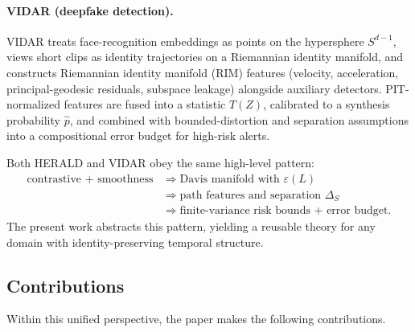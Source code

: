 \documentclass[11pt]{article}
\begin{document}
\paragraph{VIDAR (deepfake detection).}
VIDAR treats face-recognition embeddings as points on the hypersphere $S^{d-1}$, views short clips as identity trajectories on a Riemannian identity manifold, and constructs Riemannian identity manifold (RIM) features (velocity, acceleration, principal-geodesic residuals, subspace leakage) alongside auxiliary detectors. PIT-normalized features are fused into a statistic $T(Z)$, calibrated to a synthesis probability $\hat p$, and combined with bounded-distortion and separation assumptions into a compositional error budget for high-risk alerts.

Both HERALD and VIDAR obey the same high-level pattern:
\begin{align*}
\text{contrastive + smoothness} &\Rightarrow \text{Davis manifold with }\varepsilon(L) \\
&\Rightarrow \text{path features and separation }\Delta_S \\
&\Rightarrow \text{finite-variance risk bounds + error budget}.
\end{align*}
The present work abstracts this pattern, yielding a reusable theory for any domain with identity-preserving temporal structure.

\subsection{Contributions}
\label{sec:contributions}

Within this unified perspective, the paper makes the following contributions.
\end{document}
